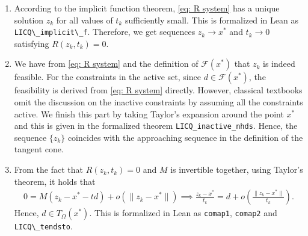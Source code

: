 \documentclass[sn-mathphys]{JORSC-jnl}%
\theoremstyle{thmstyleone}%
\theoremstyle{thmstylethree}%
\newcommand{\lean}[1]{\lstinline[language=lean, mathescape=true]{#1}}
\begin{document}
\begin{enumerate}
\begin{align}\label{eq: R system}
\begin{aligned}    
R(z, t) &= \begin{bmatrix}
        c(z) - tAd\\Z^\top(z - x^\ast - td)
    \end{bmatrix} = \begin{bmatrix}
        c(z) \\Z^\top(z - x^\ast)
    \end{bmatrix} -t \begin{bmatrix}
       A\\Z^\top
    \end{bmatrix} d \\&= t R_1(z) - tMd = \begin{bmatrix}
        0\\0
    \end{bmatrix}.
\end{aligned}
\end{align}

We can verify that the matrix $M$ is an injection, which is formalized as \lean{LICQ\_injM}. Hence $M$ is invertible. $R_1(z)$ has Jacobian matrix $M$ at $x^\ast$ in the sense of strict differentiability. 
\item According to the implicit function theorem, \eqref{eq: R system} has a unique solution $z_k$ for all values of $t_k$ sufficiently small. This is formalized in Lean as \lean{LICQ\_implicit\_f}. Therefore, we get sequences $z_k \to x^\ast$ and $t_k \to 0$ satisfying $R(z_k,t_k)=0$.
\item We have from \eqref{eq: R system} and the definition of $\mathcal{F}(x^\ast)$ that $z_k$ is indeed feasible. For the constraints in the active set, since $d \in \mathcal{F}(x^\ast)$, the feasibility is derived from \eqref{eq: R system} directly. However, classical textbooks omit the discussion on the inactive constraints by assuming all the constraints active. We finish this part by taking Taylor's expansion around the point $x^\ast$ and this is given in the formalized theorem \lean{LICQ_inactive_nhds}. Hence, the sequence $\{z_k\}$ coincides with the approaching sequence in the definition of the tangent cone.
\item From the fact that $R(z_k, t_k) = 0$ and $M$ is invertible together,  using Taylor's theorem, it holds that 
\begin{align*}
    0 = M(z_k - x^\ast - td) + o(\lVert z_k - x^\ast\rVert) \implies \frac{z_k - x^\ast}{t_k} = d + o\left(\frac{\lVert z_k - x^\ast\rVert}{t_k}\right).
\end{align*}
Hence, $d \in T_\Omega(x^\ast)$. This is formalized in Lean as \lean{comap1}, \lean{comap2} and \lean{LICQ\_tendsto}.
\end{enumerate}
\end{document}
